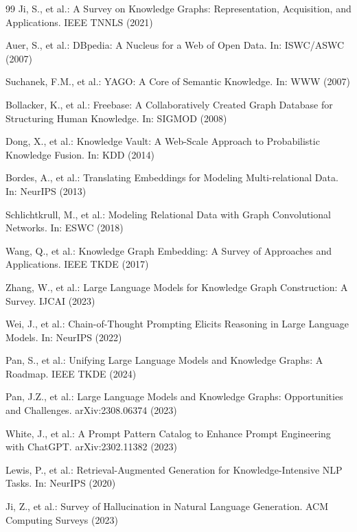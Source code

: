 \documentclass[runningheads]{llncs}
\begin{document}
\begin{thebibliography}{99}
Ji, S., et al.: A Survey on Knowledge Graphs: Representation, Acquisition, and Applications. IEEE TNNLS (2021)

Auer, S., et al.: DBpedia: A Nucleus for a Web of Open Data. In: ISWC/ASWC (2007)

Suchanek, F.M., et al.: YAGO: A Core of Semantic Knowledge. In: WWW (2007)

Bollacker, K., et al.: Freebase: A Collaboratively Created Graph Database for Structuring Human Knowledge. In: SIGMOD (2008)

Dong, X., et al.: Knowledge Vault: A Web-Scale Approach to Probabilistic Knowledge Fusion. In: KDD (2014)

Bordes, A., et al.: Translating Embeddings for Modeling Multi-relational Data. In: NeurIPS (2013)

Schlichtkrull, M., et al.: Modeling Relational Data with Graph Convolutional Networks. In: ESWC (2018)

Wang, Q., et al.: Knowledge Graph Embedding: A Survey of Approaches and Applications. IEEE TKDE (2017)

Zhang, W., et al.: Large Language Models for Knowledge Graph Construction: A Survey. IJCAI (2023)

Wei, J., et al.: Chain-of-Thought Prompting Elicits Reasoning in Large Language Models. In: NeurIPS (2022)

Pan, S., et al.: Unifying Large Language Models and Knowledge Graphs: A Roadmap. IEEE TKDE (2024)

Pan, J.Z., et al.: Large Language Models and Knowledge Graphs: Opportunities and Challenges. arXiv:2308.06374 (2023)

White, J., et al.: A Prompt Pattern Catalog to Enhance Prompt Engineering with ChatGPT. arXiv:2302.11382 (2023)

Lewis, P., et al.: Retrieval-Augmented Generation for Knowledge-Intensive NLP Tasks. In: NeurIPS (2020)

Ji, Z., et al.: Survey of Hallucination in Natural Language Generation. ACM Computing Surveys (2023)


\end{thebibliography}
\end{document}
